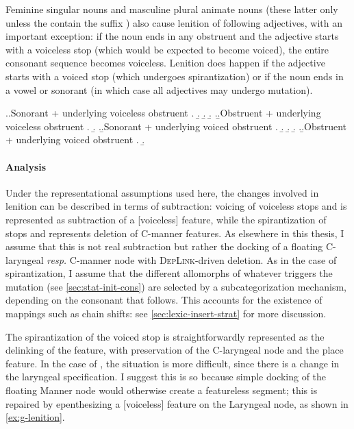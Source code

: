 Feminine singular nouns and masculine plural animate nouns (these latter only unless the contain the suffix ) also cause lenition of following adjectives, with an important exception: if the noun ends in any obstruent and the adjective starts with a voiceless stop (which would be expected to become voiced), the entire consonant sequence becomes voiceless. Lenition does happen if the adjective starts with a voiced stop (which undergoes spirantization) or if the noun ends in a vowel or sonorant (in which case all adjectives may undergo mutation).

\ex.\label{ex:bothoa-lenition-failure}\a.Sonorant + underlying voiceless obstruent
\a.
\b.
\b.
\b.
\z.\b.Obstruent + underlying voiceless obstruent
\a.
\b.
\z.\b.Sonorant + underlying voiced obstruent
\a.
\b.
\b.
\b.
\z.\b.Obstruent + underlying voiced obstruent
\a.
\b.

\paragraph{Analysis}
\label{sec:analysis-4}

Under the representational assumptions used here, the changes involved in lenition can be described in terms of subtraction: voicing of voiceless stops and \ipa{[r̥]} is represented as subtraction of a [voiceless] feature, while the spirantization of stops and \ipa{[m]} represents deletion of C-manner features. As elsewhere in this thesis, I assume that this is not real subtraction but rather the docking of a floating C-laryngeal \emph{resp.\@} C-manner node with \textsc{DepLink}\hyp driven deletion. As in the case of spirantization, I assume that the different allomorphs of whatever triggers the mutation (see \cref{sec:stat-init-cons}) are selected by a subcategorization mechanism, depending on the consonant that follows. This accounts for the existence of mappings such as chain shifts: see \cref{sec:lexic-insert-strat} for more discussion.

The spirantization of the voiced stop \ipa{[b]} is straightforwardly represented as the delinking of the  feature, with preservation of the C-laryngeal node and the place feature. In the case of \ipa{[ɡ]}, the situation is more difficult, since there is a change in the laryngeal specification. I suggest this is so because  simple docking of the floating Manner node would otherwise create a featureless segment; this is repaired by epenthesizing a [voiceless] feature on the Laryngeal node, as shown in \ref{ex:g-lenition}.

